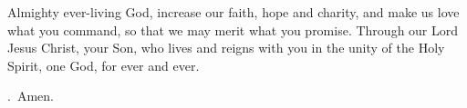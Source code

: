 \lettrine[lines=3]{A}{}lmighty ever-living God, increase our faith, hope and charity, and make us love what you command, so that we may merit what you promise. Through our Lord Jesus Christ, your Son, who lives and reigns with you in the unity of the Holy Spirit, one God, for ever and ever. \par \Rbar.~Amen. 
